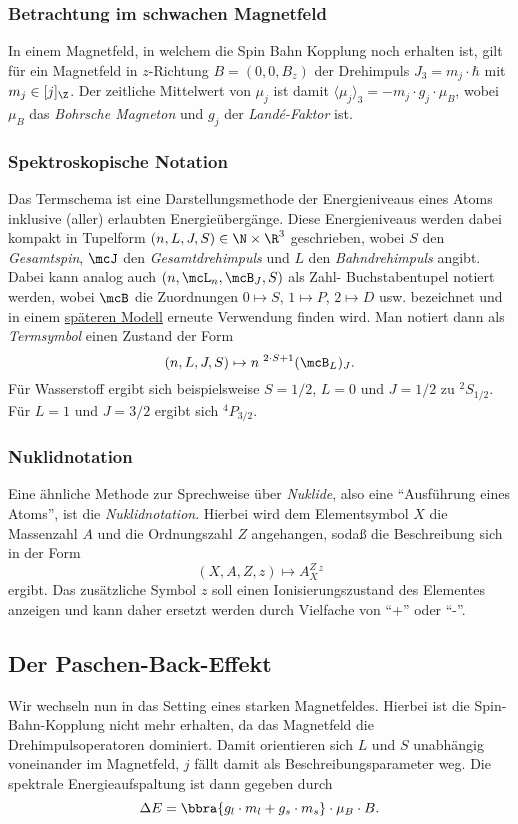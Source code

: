 \documentclass{subfiles}
\begin{document}

    \subsubsection*{Betrachtung im schwachen Magnetfeld}
        In einem Magnetfeld, in welchem die Spin Bahn Kopplung noch erhalten ist, gilt für ein Magnetfeld in $z$-Richtung $B = (0,0,B_z)$ der Drehimpuls $J_3 = m_j\cdot\hbar$ mit $m_j\in[j]_\Z$. Der zeitliche Mittelwert von $\mu_j$ ist damit $\langle\mu_j\rangle_3 = -m_j\cdot g_j\cdot\mu_B$, wobei $\mu_B$ das \emph{Bohrsche Magneton} und $g_j$ der \emph{Landé-Faktor} ist. 
        
    \subsubsection*{Spektroskopische Notation}\label{not:SpektNot}
        Das Termschema ist eine Darstellungsmethode der Energieniveaus eines Atoms inklusive (aller) erlaubten Energieübergänge. Diese Energieniveaus werden dabei kompakt in Tupelform $(n,L,J,S)\in\N\times\R^3$ geschrieben, wobei $S$ den \emph{Gesamtspin}, $\mcJ$ den \emph{Gesamtdrehimpuls} und $L$ den \emph{Bahndrehimpuls} angibt. Dabei kann analog auch $(n,\mcL_n,\mcB_J,S)$ als Zahl- Buchstabentupel notiert werden, wobei $\mcB$ die Zuordnungen $0\mapsto S$, $1\mapsto P$, $2\mapsto D$ usw. bezeichnet und in einem \hyperref[not:SchalenNot]{späteren Modell} erneute Verwendung finden wird. Man notiert dann als \emph{Termsymbol} einen Zustand der Form
        \[
            (n,L,J,S) \mapsto n\;^{2\cdot S + 1}(\mcB_L)_J. 
        \]
        Für Wasserstoff ergibt sich beispielsweise $S = 1/2$, $L = 0$ und $J = 1/2$ zu $^2S_{1/2}$. Für $L = 1$ und $J = 3/2$ ergibt sich $^4P_{3/2}$.

    \subsubsection*{Nuklidnotation}
        Eine ähnliche Methode zur Sprechweise über \emph{Nuklide}, also eine \enquote{Ausführung eines Atoms}, ist die \emph{Nuklidnotation}. Hierbei wird dem Elementsymbol $X$ die Massenzahl $A$ und die Ordnungszahl $Z$ angehangen, sodaß die Beschreibung sich in der Form
        \[
            (X,A,Z,z)\mapsto A^Z_X^z
        \]
        ergibt. Das zusätzliche Symbol $z$ soll einen Ionisierungszustand des Elementes anzeigen und kann daher ersetzt werden durch Vielfache von \enquote{+} oder \enquote{-}.  

    \subsection{Der Paschen-Back-Effekt}
        Wir wechseln nun in das Setting eines starken Magnetfeldes. Hierbei ist die Spin-Bahn-Kopplung nicht mehr erhalten, da das Magnetfeld die Drehimpulsoperatoren dominiert. Damit orientieren sich $L$ und $S$ unabhängig voneinander im Magnetfeld, $j$ fällt damit als Beschreibungsparameter weg. Die spektrale Energieaufspaltung ist dann gegeben durch
        \[
            \Delta E = \bbra{g_l\cdot m_l + g_s\cdot m_s}\cdot\mu_B\cdot B.
        \]
        

    
\end{document}
